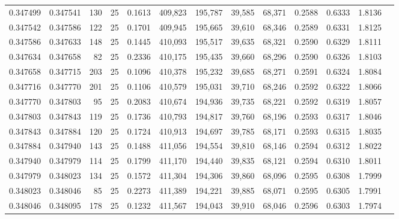 \begin{tabular}{rrrrrrrrrrrrr}
0.347499 & 0.347541 &   130 &  25 &                                     0.1613 & 409,823 & 195,787 &  39,585 &  68,371 & 0.2588 & 0.6333 & 1.8136 \\
0.347542 & 0.347586 &   122 &  25 &                                     0.1701 & 409,945 & 195,665 &  39,610 &  68,346 & 0.2589 & 0.6331 & 1.8125 \\
0.347586 & 0.347633 &   148 &  25 &                                     0.1445 & 410,093 & 195,517 &  39,635 &  68,321 & 0.2590 & 0.6329 & 1.8111 \\
0.347634 & 0.347658 &    82 &  25 &                                     0.2336 & 410,175 & 195,435 &  39,660 &  68,296 & 0.2590 & 0.6326 & 1.8103 \\
0.347658 & 0.347715 &   203 &  25 &                                     0.1096 & 410,378 & 195,232 &  39,685 &  68,271 & 0.2591 & 0.6324 & 1.8084 \\
0.347716 & 0.347770 &   201 &  25 &                                     0.1106 & 410,579 & 195,031 &  39,710 &  68,246 & 0.2592 & 0.6322 & 1.8066 \\
0.347770 & 0.347803 &    95 &  25 &                                     0.2083 & 410,674 & 194,936 &  39,735 &  68,221 & 0.2592 & 0.6319 & 1.8057 \\
0.347803 & 0.347843 &   119 &  25 &                                     0.1736 & 410,793 & 194,817 &  39,760 &  68,196 & 0.2593 & 0.6317 & 1.8046 \\
0.347843 & 0.347884 &   120 &  25 &                                     0.1724 & 410,913 & 194,697 &  39,785 &  68,171 & 0.2593 & 0.6315 & 1.8035 \\
0.347884 & 0.347940 &   143 &  25 &                                     0.1488 & 411,056 & 194,554 &  39,810 &  68,146 & 0.2594 & 0.6312 & 1.8022 \\
0.347940 & 0.347979 &   114 &  25 &                                     0.1799 & 411,170 & 194,440 &  39,835 &  68,121 & 0.2594 & 0.6310 & 1.8011 \\
0.347979 & 0.348023 &   134 &  25 &                                     0.1572 & 411,304 & 194,306 &  39,860 &  68,096 & 0.2595 & 0.6308 & 1.7999 \\
0.348023 & 0.348046 &    85 &  25 &                                     0.2273 & 411,389 & 194,221 &  39,885 &  68,071 & 0.2595 & 0.6305 & 1.7991 \\
0.348046 & 0.348095 &   178 &  25 &                                     0.1232 & 411,567 & 194,043 &  39,910 &  68,046 & 0.2596 & 0.6303 & 1.7974 \\

\end{tabular}

